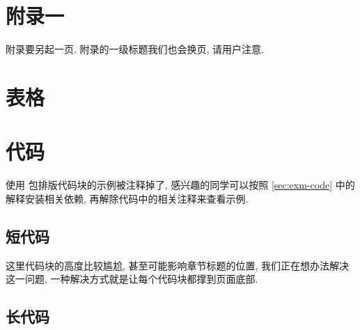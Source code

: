 
\section{附录一}

附录要另起一页. 附录的一级标题我们也会换页, 请用户注意.

\zhlipsum

\section{表格}


\section{代码}

使用  包排版代码块的示例被注释掉了, 感兴趣的同学可以按照 \ref{sec:exm-code} 中的解释安装相关依赖, 再解除代码中的相关注释来查看示例.

\subsection{短代码}

这里代码块的高度比较尴尬, 甚至可能影响章节标题的位置, 我们正在想办法解决这一问题, 一种解决方式就是让每个代码块都撑到页面底部.


\subsection{长代码}

